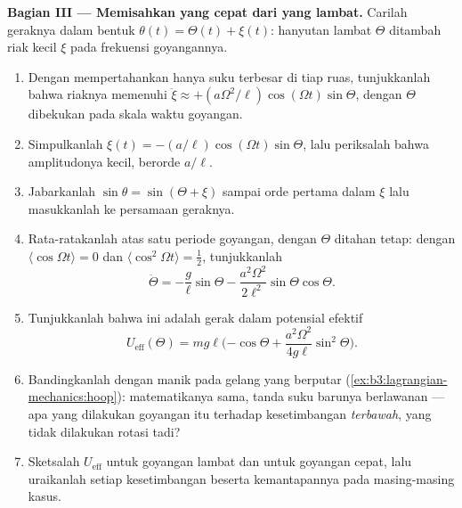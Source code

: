 \begin{problem}
\medskip\noindent\textbf{Bagian III --- Memisahkan yang cepat dari yang lambat.}
Carilah geraknya dalam bentuk $\theta(t) = \Theta(t) + \xi(t)$: hanyutan
lambat $\Theta$ ditambah riak kecil $\xi$ pada frekuensi goyangannya.
\begin{enumerate}[resume]
  \item Dengan mempertahankan hanya suku terbesar di tiap ruas,
        tunjukkanlah bahwa riaknya memenuhi
        $\ddot\xi \approx +(a\Omega^2/\ell)\cos(\Omega t)
        \sin\Theta$, dengan $\Theta$ dibekukan pada skala waktu goyangan.
  \item Simpulkanlah $\xi(t) = -(a/\ell)\cos(\Omega t)\sin\Theta$, lalu
        periksalah bahwa amplitudonya kecil, berorde $a/\ell$.
  \item Jabarkanlah $\sin\theta = \sin(\Theta + \xi)$ sampai orde
        pertama dalam $\xi$ lalu masukkanlah ke persamaan geraknya.
  \item Rata-ratakanlah atas satu periode goyangan, dengan $\Theta$
        ditahan tetap: dengan $\langle\cos\Omega t\rangle = 0$ dan
        $\langle\cos^2\Omega t\rangle = \tfrac12$, tunjukkanlah
        \[
        \ddot\Theta = -\frac{g}{\ell}\sin\Theta
         - \frac{a^2\Omega^2}{2\ell^2}\sin\Theta\cos\Theta .
        \]
  \item Tunjukkanlah bahwa ini adalah gerak dalam potensial efektif
        \[
        U_{\text{eff}}(\Theta) = mg\ell\Big({-\cos\Theta}
         + \frac{a^2\Omega^2}{4g\ell}\sin^2\Theta\Big) .
        \]
  \item Bandingkanlah dengan manik pada gelang yang berputar
        (\cref{ex:b3:lagrangian-mechanics:hoop}): matematikanya sama,
        tanda suku barunya berlawanan --- apa yang dilakukan goyangan
        itu terhadap kesetimbangan \emph{terbawah}, yang tidak dilakukan
        rotasi tadi?
  \item Sketsalah $U_{\text{eff}}$ untuk goyangan lambat dan untuk
        goyangan cepat, lalu uraikanlah setiap kesetimbangan beserta
        kemantapannya pada masing-masing kasus.
\end{enumerate}


\end{problem}
